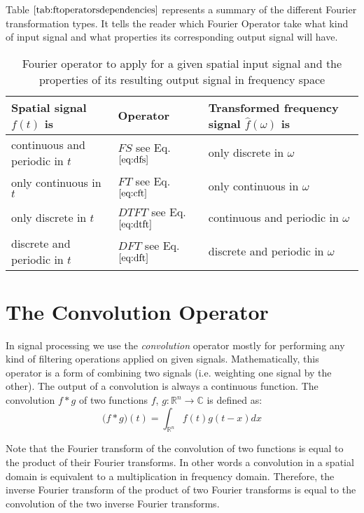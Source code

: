 Table $\ref{tab:ftoperatorsdependencies}$ represents a summary of the different Fourier transformation types. It tells the reader which Fourier Operator take what kind of input signal and what properties its corresponding output signal will have.

\begin{table}[H]
    \begin{tabular}{l|l|l}
    \hline
    Spatial signal $f(t)$ is & Operator & Transformed frequency signal $\hat{f}(\omega)$ is\\
    \hline
    continuous and periodic in $t$ & $FS$ see Eq. $\ref{eq:dfs}$ & only discrete in $\omega$ \\
    only continuous in $t$ & $FT$ see Eq. $\ref{eq:cft}$ & only continuous in $\omega$\\
    only discrete in $t$ & $DTFT$ see Eq. $\ref{eq:dtft}$ & continuous and periodic in $\omega$\\
    discrete and periodic in $t$ & $DFT$ see Eq.$\ref{eq:dft}$ & discrete and periodic in $\omega$\\
    \hline
    \end{tabular}
\caption[Fourier Transform Mapping]{Fourier operator to apply for a given spatial input signal and the properties of its resulting output signal in frequency space}
\label{tab:ftoperatorsdependencies}
\end{table}

\section{The Convolution Operator}
In signal processing we use the \emph{convolution} operator mostly for performing any kind of filtering operations applied on given signals.
Mathematically, this operator is a form of combining two signals (i.e. weighting one signal by the other). The output of a convolution is always a continuous function. The convolution $f*g$ of two functions $f$, $g$$\colon \mathds{R}^n \to \mathds{C} $ is defined as:  
\begin{equation}
  \mathcal (f*g)(t) = \int_{\mathds{R}^n} f(t)g(t-x) dx
  \label{eq:convolution}
\end{equation}

Note that the Fourier transform of the convolution of two functions is equal to the product of their Fourier transforms. In other words a convolution in a spatial domain is equivalent to a multiplication in frequency domain. Therefore, the inverse Fourier transform of the product of two Fourier transforms is equal to the convolution of the two inverse Fourier transforms. \\

